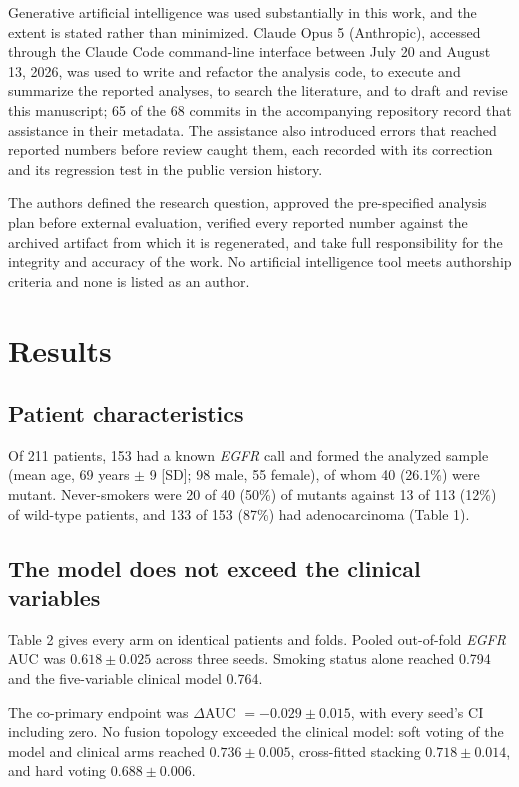 \documentclass[11pt]{article}
\begin{document}
Generative artificial intelligence was used substantially in this work, and the
extent is stated rather than minimized. Claude Opus 5 (Anthropic), accessed
through the Claude Code command-line interface between July 20 and August 13,
2026, was used to write and refactor the analysis code, to execute and summarize
the reported analyses, to search the literature, and to draft and revise this
manuscript; 65 of the 68 commits in the accompanying repository record that
assistance in their metadata. The assistance also introduced errors that reached
reported numbers before review caught them, each recorded with its correction and
its regression test in the public version history.

The authors defined the research question, approved the pre-specified analysis
plan before external evaluation, verified every reported number against the
archived artifact from which it is regenerated, and take full responsibility for
the integrity and accuracy of the work. No artificial intelligence tool meets
authorship criteria and none is listed as an author.

\section*{Results}

\subsection*{Patient characteristics}

Of 211 patients, 153 had a known \textit{EGFR} call and formed the analyzed sample
(mean age, 69 years $\pm$ 9 [SD]; 98 male, 55 female), of whom 40 (26.1\%) were
mutant. Never-smokers were 20 of 40 (50\%) of mutants against 13 of 113 (12\%) of
wild-type patients, and 133 of 153 (87\%) had adenocarcinoma (Table 1).

\subsection*{The model does not exceed the clinical variables}

Table 2 gives every arm on identical patients and folds. Pooled out-of-fold
\textit{EGFR} AUC was $0.618 \pm 0.025$ across three seeds. Smoking status alone
reached 0.794 and the five-variable clinical model 0.764.

The co-primary endpoint was $\Delta$AUC $= -0.029 \pm 0.015$, with every seed's CI
including zero. No fusion topology exceeded the clinical model: soft voting of the
model and clinical arms reached $0.736 \pm 0.005$, cross-fitted stacking
$0.718 \pm 0.014$, and hard voting $0.688 \pm 0.006$.
\end{document}
